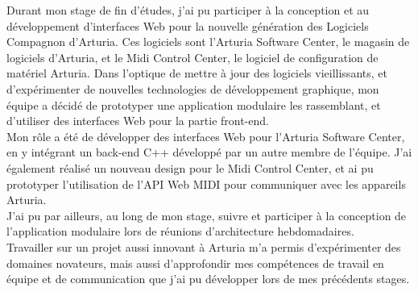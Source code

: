 \documentclass[francais]{rapportPFE}  %
\begin{document}
\begin{ResumeMotsCles}
\begin{resumeFr}
Durant mon stage de fin d'études, j'ai pu participer à la conception et au développement d'interfaces Web pour la nouvelle génération des Logiciels Compagnon d'Arturia. Ces logiciels sont l'Arturia Software Center, le magasin de logiciels d'Arturia, et le Midi Control Center, le logiciel de configuration de matériel Arturia. Dans l'optique de mettre à jour des logiciels vieillissants, et d'expérimenter de nouvelles technologies de développement graphique, mon équipe a décidé de prototyper une application modulaire les rassemblant, et d'utiliser des interfaces Web pour la partie front-end. \\
Mon rôle a été de développer des interfaces Web pour l'Arturia Software Center, en y intégrant un back-end C++ développé par un autre membre de l'équipe. J'ai également réalisé un nouveau design pour le Midi Control Center, et ai pu prototyper l'utilisation de l'API Web MIDI pour communiquer avec les appareils Arturia.  \\
J'ai pu par ailleurs, au long de mon stage, suivre et participer à la conception de l'application modulaire lors de réunions d'architecture hebdomadaires.\\
Travailler sur un projet aussi innovant à Arturia m'a permis d'expérimenter des domaines novateurs, mais aussi d'approfondir mes compétences de travail en équipe et de communication que j'ai pu développer lors de mes précédents stages. 
\end{resumeFr}

\end{ResumeMotsCles}








\setcounter{tocdepth}{3}
\renewcommand{\contentsname}{Sommaire}
\tableofcontents
\cleardoublepage
\end{document}
